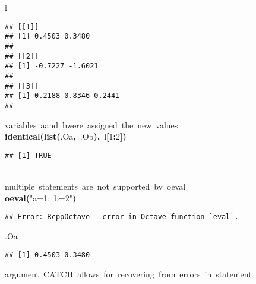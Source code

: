\documentclass[english,10pt,a4paper]{article}\usepackage{graphicx, color}
\makeatletter
\newcommand{\hlnumber}[1]{\textcolor[rgb]{0,0,0}{#1}}%
\newcommand{\hlfunctioncall}[1]{\textcolor[rgb]{0.501960784313725,0,0.329411764705882}{\textbf{#1}}}%
\newcommand{\hlstring}[1]{\textcolor[rgb]{0.6,0.6,1}{#1}}%
\newcommand{\hlkeyword}[1]{\textcolor[rgb]{0,0,0}{\textbf{#1}}}%
\newcommand{\hlcomment}[1]{\textcolor[rgb]{0.180392156862745,0.6,0.341176470588235}{#1}}%
\newcommand{\hlsymbol}[1]{\textcolor[rgb]{0,0,0}{#1}}%
\newcommand{\hlstd}[1]{\textcolor[rgb]{0,0,0}{#1}}%
\newenvironment{kframe}{%
 \def\FrameCommand##1{\hskip\@totalleftmargin \hskip-\fboxsep
 \colorbox{shadecolor}{##1}\hskip-\fboxsep
     \hskip-\linewidth \hskip-\@totalleftmargin \hskip\columnwidth}%
 \MakeFramed {\advance\hsize-\width
   \@totalleftmargin\z@ \linewidth\hsize
   \@setminipage}}%
 {\par\unskip\endMakeFramed}
\newenvironment{knitrout}{}{} %
\makeatother
\begin{document}
\begin{knitrout}
\begin{kframe}
\begin{flushleft}
\hlstd{}\hlsymbol{l}\mbox{}
\normalfont
\end{flushleft}
\begin{verbatim}
## [[1]]
## [1] 0.4503 0.3480
## 
## [[2]]
## [1] -0.7227 -1.6021
## 
## [[3]]
## [1] 0.2188 0.8346 0.2441
## 
\end{verbatim}
\begin{flushleft}
\ttfamily\noindent
\hlcomment{\usebox{\hlnormalsizeboxhash}{\ }variables{\ }\usebox{\hlnormalsizeboxsinglequote}a\usebox{\hlnormalsizeboxsinglequote}{\ }and{\ }\usebox{\hlnormalsizeboxsinglequote}b\usebox{\hlnormalsizeboxsinglequote}{\ }were{\ }assigned{\ }the{\ }new{\ }values}\hspace*{\fill}\\
\hlstd{}\hlfunctioncall{identical}\hlkeyword{(}\hlfunctioncall{list}\hlkeyword{(}\hlsymbol{.O}\hlkeyword{\usebox{\hlnormalsizeboxdollar}}\hlsymbol{a}\hlkeyword{,}{\ }\hlsymbol{.O}\hlkeyword{\usebox{\hlnormalsizeboxdollar}}\hlsymbol{b}\hlkeyword{)}\hlkeyword{,}{\ }\hlsymbol{l}\hlkeyword{[}\hlnumber{1}\hlkeyword{:}\hlnumber{2}\hlkeyword{]}\hlkeyword{)}\mbox{}
\normalfont
\end{flushleft}
\begin{verbatim}
## [1] TRUE
\end{verbatim}
\begin{flushleft}
\ttfamily\noindent
\hspace*{\fill}\\
\hlstd{}\hlcomment{\usebox{\hlnormalsizeboxhash}{\ }multiple{\ }statements{\ }are{\ }not{\ }supported{\ }by{\ }o\usebox{\hlnormalsizeboxunderscore}eval}\hspace*{\fill}\\
\hlstd{}\hlfunctioncall{o\usebox{\hlnormalsizeboxunderscore}eval}\hlkeyword{(}\hlstring{"{}a=1;{\ }b=2"{}}\hlkeyword{)}\mbox{}
\normalfont
\end{flushleft}
\begin{verbatim}
## Error: RcppOctave - error in Octave function `eval`.
\end{verbatim}
\begin{flushleft}
\ttfamily\noindent
\hlsymbol{.O}\hlkeyword{\usebox{\hlnormalsizeboxdollar}}\hlsymbol{a}\mbox{}
\normalfont
\end{flushleft}
\begin{verbatim}
## [1] 0.4503 0.3480
\end{verbatim}
\begin{flushleft}
\ttfamily\noindent
\hlcomment{\usebox{\hlnormalsizeboxhash}{\ }argument{\ }CATCH{\ }allows{\ }for{\ }recovering{\ }from{\ }errors{\ }in{\ }statement}\hspace*{\fill}\\

\end{flushleft}
\end{kframe}
\end{knitrout}
\end{document}
